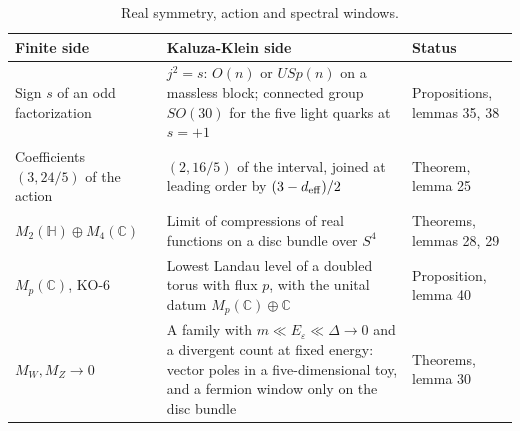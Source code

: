 \documentclass[aps,prd,reprint,onecolumn,nofootinbib,amsmath,amssymb,floatfix]{revtex4-2}
\theoremstyle{plain}
\newcommand{\C}{\mathbb C}
\renewcommand{\H}{\mathbb H}
\begin{document}
\begin{table}
\caption{\label{tab:symmetries}Real symmetry, action and spectral windows.}
\setlength{\tabcolsep}{0.01\textwidth}
\begin{ruledtabular}
\begin{tabular}{p{}p{}p{}}
Finite side&Kaluza-Klein side&Status\\
\hline
Sign $s$ of an odd factorization&$j^2=s$: $O(n)$ or $USp(n)$ on a massless block; connected group $SO(30)$ for the five light quarks at $s=+1$&Propositions, lemmas 35, 38\\
Coefficients $(3,24/5)$ of the action&$(2,16/5)$ of the interval, joined at leading order by $(3-d_{\rm eff})/2$&Theorem, lemma 25\\
$M_2(\H)\oplus M_4(\C)$&Limit of compressions of real functions on a disc bundle over $S^4$&Theorems, lemmas 28, 29\\
$M_p(\C)$, KO-6&Lowest Landau level of a doubled torus with flux $p$, with the unital datum $M_p(\C)\oplus\C$&Proposition, lemma 40\\
$M_W,M_Z\to0$&A family with $m\ll E_\varepsilon\ll\Delta\to0$ and a divergent count at fixed energy: vector poles in a five-dimensional toy, and a fermion window only on the disc bundle&Theorems, lemma 30\\
\end{tabular}
\end{ruledtabular}
\end{table}
\end{document}
